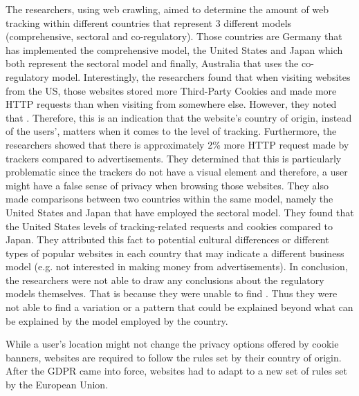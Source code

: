 \documentclass[../main.tex]{subfiles}
\begin{document}
The researchers, using web crawling, aimed to determine the amount of web tracking within different countries that represent 3 different models (comprehensive, sectoral and co-regulatory). Those countries are Germany that has implemented the comprehensive model, the United States and Japan which both represent the sectoral model and finally, Australia that uses the co-regulatory model. Interestingly, the researchers found that when visiting websites from the US, those websites stored more Third-Party Cookies and made more HTTP requests than when visiting from somewhere else. However, they noted that . Therefore, this is an indication that the website’s country of origin, instead of the users’, matters when it comes to the level of tracking. Furthermore, the researchers showed that there is approximately 2\% more HTTP request made by trackers compared to advertisements. They determined that this is particularly problematic since the trackers do not have a visual element and therefore, a user might have a false sense of privacy when browsing those websites. They also made comparisons between two countries within the same model, namely the United States and Japan that have employed the sectoral model. They found that the United States  levels of tracking-related requests and cookies compared to Japan. They attributed this fact to potential cultural differences or different types of popular websites in each country that may indicate a different business model (e.g. not interested in making money from advertisements). In conclusion, the researchers were not able to draw any conclusions about the regulatory models themselves. That is because they were unable to find . Thus they were not able to find a variation or a pattern that could be explained beyond what can be explained by the model employed by the country. 

While a user’s location might not change the privacy options offered by cookie banners, websites are required to follow the rules set by their country of origin. After the GDPR came into force, websites had to adapt to a new set of rules set by the European Union. 
\end{document}

